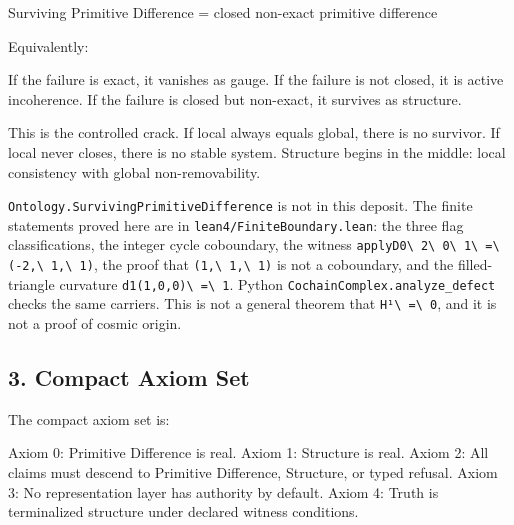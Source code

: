 \documentclass[
  10pt,
]{article}
\newenvironment{Shaded}{}{}
\newcommand{\NormalTok}[1]{#1}
\DeclareRobustCommand{\texttt}[1]{{\paperSymbolFont\nolinkurl{#1}}}
\begin{document}
\begin{Shaded}
\begin{Highlighting}[]
\NormalTok{Surviving Primitive Difference = closed non{-}exact primitive difference}
\end{Highlighting}
\end{Shaded}

Equivalently:

\begin{Shaded}
\begin{Highlighting}[]
\NormalTok{If the failure is exact, it vanishes as gauge.}
\NormalTok{If the failure is not closed, it is active incoherence.}
\NormalTok{If the failure is closed but non{-}exact, it survives as structure.}
\end{Highlighting}
\end{Shaded}

This is the controlled crack. If local always equals global, there is no survivor. If local never closes, there is no stable system. Structure begins in the middle: local consistency with global non-removability.

\texttt{Ontology.SurvivingPrimitiveDifference} is not in this deposit. The finite statements proved here are in \texttt{lean4/FiniteBoundary.lean}: the three flag classifications, the integer cycle coboundary, the witness \texttt{applyD0\ 2\ 0\ 1\ =\ (-2,\ 1,\ 1)}, the proof that \texttt{(1,\ 1,\ 1)} is not a coboundary, and the filled-triangle curvature \texttt{d1(1,0,0)\ =\ 1}. Python \texttt{CochainComplex.analyze\_defect} checks the same carriers. This is not a general theorem that \texttt{H¹\ =\ 0}, and it is not a proof of cosmic origin.

\subsection{3. Compact Axiom Set}\label{compact-axiom-set}

The compact axiom set is:

\begin{Shaded}
\begin{Highlighting}[]
\NormalTok{Axiom 0: Primitive Difference is real.}
\NormalTok{Axiom 1: Structure is real.}
\NormalTok{Axiom 2: All claims must descend to Primitive Difference, Structure, or typed refusal.}
\NormalTok{Axiom 3: No representation layer has authority by default.}
\NormalTok{Axiom 4: Truth is terminalized structure under declared witness conditions.}
\end{Highlighting}
\end{Shaded}
\end{document}
